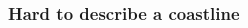 \documentclass[12pt]{beamer}
\begin{document}
\begin{frame}
\frametitle{Hard to describe a coastline}
\begin{columns}
\begin{column}{0.55\linewidth}
\vspace{1em}
%

\end{column}
\end{columns}
\end{frame}
\end{document}
